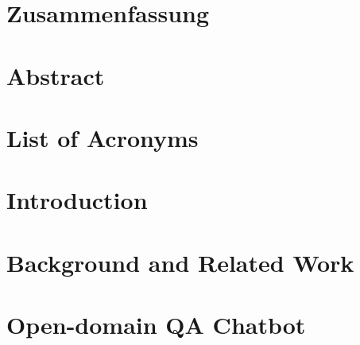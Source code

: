 \documentclass[
     12pt,         %
     a4paper,      %
     BCOR10mm,     %
     DIV14,        %
     ]{scrreprt}
\begin{document}
\chapter*{Zusammenfassung}

\newpage

\chapter*{Abstract}

\newpage

\tableofcontents
\cleardoublepage

\chapter*{List of Acronyms}
\printglossary[type=\acronymtype]

\listoffigures
\listoftables



\chapter{Introduction}
\label{chap:intro}


\newpage

\chapter{Background and Related Work}
\label{chap:grundlagen}



\newpage

\chapter{Open-domain QA Chatbot}
\label{chap:main}
\end{document}

